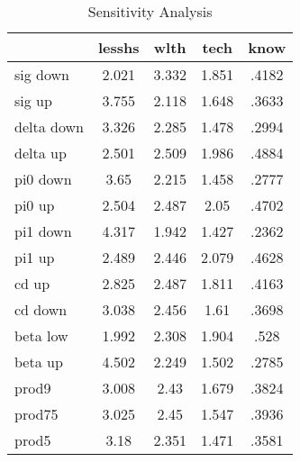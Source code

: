 \begin{table}[htbp]
\caption{\label{clabel} Sensitivity Analysis}\centering\medskip
\begin{tabular}{lcccc} \hline \hline
 & lesshs  & wlth  & tech  & know  \\  \hline 
sig down &     2.021 &     3.332 &     1.851 &     .4182 \\  
sig up &     3.755 &     2.118 &     1.648 &     .3633 \\  
delta down &     3.326 &     2.285 &     1.478 &     .2994 \\  
delta up &     2.501 &     2.509 &     1.986 &     .4884 \\  
pi0 down &      3.65 &     2.215 &     1.458 &     .2777 \\  
pi0 up &     2.504 &     2.487 &      2.05 &     .4702 \\  
pi1 down &     4.317 &     1.942 &     1.427 &     .2362 \\  
pi1 up &     2.489 &     2.446 &     2.079 &     .4628 \\  
cd up &     2.825 &     2.487 &     1.811 &     .4163 \\  
cd down &     3.038 &     2.456 &      1.61 &     .3698 \\  
beta low &     1.992 &     2.308 &     1.904 &      .528 \\  
beta up &     4.502 &     2.249 &     1.502 &     .2785 \\  
prod9 &     3.008 &      2.43 &     1.679 &     .3824 \\  
prod75 &     3.025 &      2.45 &     1.547 &     .3936 \\  
prod5 &      3.18 &     2.351 &     1.471 &     .3581 \\  
\hline \hline \end{tabular}
\end{table}
